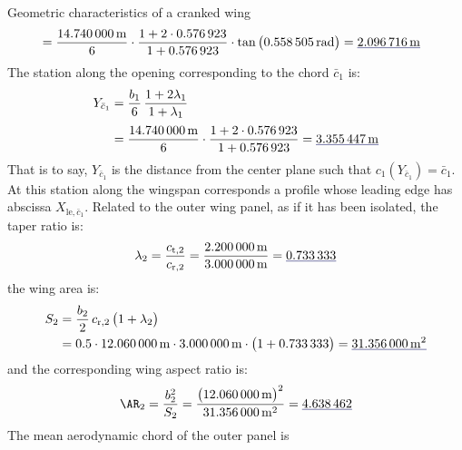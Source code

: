 \documentclass[[12pt,twoside]{book}
\begin{document}
\begin{myExampleX}{Geometric characteristics of a cranked wing}{}
\[\begin{split}
  & {}=
    \frac{\SI[round-precision=1]{\mySpanWingIMT}{\metre}}{6}
      \cdot 
      \frac{
        1 + 2\cdot\SI[round-precision=2]{\myTaperRatioWingI}{}
      }{
        1 + \SI[round-precision=2]{\myTaperRatioWingI}{}
      }
      \cdot \tan \big( \SI[round-precision=3]{\mySweepLEWingIRAD}{\radian} \big)
    = \mathunderline{mydarkblue}{ \SI[round-precision=2]{\myXMACLEToApexWingIMT}{\metre} }
\end{split}
\]
The station along the opening corresponding to the chord $\bar{c}_1$ is:
\[
\begin{split}
Y_{\bar{c}_1} 
  & {}=
    \frac{b_1}{6} \, \frac{1+2\lambda_1}{1+\lambda_1} \\[3pt]
  & {}=
    \frac{\SI[round-precision=1]{\mySpanWingIMT}{\metre}}{6}
      \cdot 
      \frac{
        1 + 2\cdot\SI[round-precision=2]{\myTaperRatioWingI}{}
      }{
        1 + \SI[round-precision=2]{\myTaperRatioWingI}{}
      }
    = \mathunderline{mydarkblue}{ \SI[round-precision=2]{\myYMACWingIMT}{\metre} }
\end{split}
\]
That is to say, $Y_{\bar{c}_1}$ is the distance from the center plane such that
$c_1(Y_{\bar{c}_1})=\bar{c}_1$. At this station along the wingspan corresponds a profile whose leading edge has abscissa $X_{\mathrm{le},\bar{c}_1}$.
Related to the outer wing panel, as if it has been isolated, the taper ratio is:
\[
\lambda_2
  =\frac{c_{\mathrm{t},2}}{c_{\mathrm{r},2}}
  =\frac{\SI[round-precision=2]{\myChordTipWingIIMT}{\metre}}{\SI[round-precision=2]{\myChordRootWingIIMT}{\metre}}
  =\mathunderline{mydarkblue}{ \SI[round-precision=2]{\myTaperRatioWingII}{} }
\]
the wing area is:
\[
\begin{split}
S_2 & {}= \frac{b_2}{2} \, c_{\mathrm{r},2} \, \big( 1 + \lambda_2 \big) \\
  & {}=
    \num{0.5} \cdot \SI[round-precision=1]{\mySpanWingIIMT}{\metre}
      \cdot \SI[round-precision=2]{\myChordRootWingIIMT}{\metre}
      \cdot \big( 1 + \SI[round-precision=2]{\myTaperRatioWingII}{} \big) 
    = \mathunderline{mydarkblue}{ \SI[round-precision=1]{\myAreaWingIIMTsquared}{\metre^2} }
\end{split}
\]
and the corresponding wing aspect ratio is:
\[
\AR_2 
  = \frac{b_2^2}{S_2}
  = \frac{\big(\SI[round-precision=1]{\mySpanWingIIMT}{\metre}\big)^2}{\SI[round-precision=1]{\myAreaWingIIMTsquared}{\metre^2}}
  = \mathunderline{mydarkblue}{ \num[round-precision=2]{\myAspectRatioWingII} }
\]
%
The mean aerodynamic chord of the outer panel is
\[
\begin{split}

\end{split}\]
\end{myExampleX}
\end{document}
